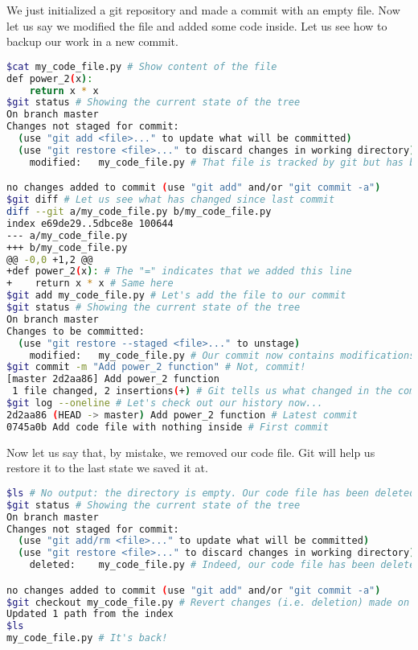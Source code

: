 \documentclass[12pt]{article}
\begin{document}
We just initialized a git repository and made a commit with an empty file. Now let us say we modified the file and added some code inside. Let us see how to backup our work in a new commit.

\begin{lstlisting}[language=bash]
$cat my_code_file.py # Show content of the file
def power_2(x):
    return x * x
$git status # Showing the current state of the tree
On branch master
Changes not staged for commit:
  (use "git add <file>..." to update what will be committed)
  (use "git restore <file>..." to discard changes in working directory)
	modified:   my_code_file.py # That file is tracked by git but has been modified. In the previous example, it was not tracked by git at all so its label was "new file", not "modified"

no changes added to commit (use "git add" and/or "git commit -a")
$git diff # Let us see what has changed since last commit
diff --git a/my_code_file.py b/my_code_file.py
index e69de29..5dbce8e 100644
--- a/my_code_file.py
+++ b/my_code_file.py
@@ -0,0 +1,2 @@
+def power_2(x): # The "=" indicates that we added this line
+    return x * x # Same here
$git add my_code_file.py # Let's add the file to our commit
$git status # Showing the current state of the tree
On branch master
Changes to be committed:
  (use "git restore --staged <file>..." to unstage)
	modified:   my_code_file.py # Our commit now contains modifications to my_code_file.py
$git commit -m "Add power_2 function" # Not, commit!
[master 2d2aa86] Add power_2 function
 1 file changed, 2 insertions(+) # Git tells us what changed in the commit whe just made
$git log --oneline # Let's check out our history now...
2d2aa86 (HEAD -> master) Add power_2 function # Latest commit
0745a0b Add code file with nothing inside # First commit
\end{lstlisting}

Now let us say that, by mistake, we removed our code file. Git will help us restore it to the last state we saved it at.

\begin{lstlisting}[language=bash]
$ls # No output: the directory is empty. Our code file has been deleted!
$git status # Showing the current state of the tree
On branch master
Changes not staged for commit:
  (use "git add/rm <file>..." to update what will be committed)
  (use "git restore <file>..." to discard changes in working directory)
	deleted:    my_code_file.py # Indeed, our code file has been deleted

no changes added to commit (use "git add" and/or "git commit -a")
$git checkout my_code_file.py # Revert changes (i.e. deletion) made on my_code_file.py
Updated 1 path from the index
$ls
my_code_file.py # It's back!
\end{lstlisting}
\end{document}
